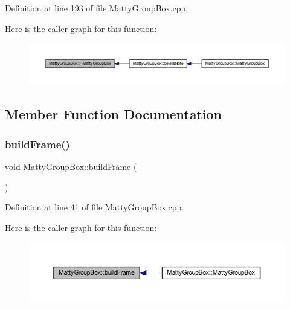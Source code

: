 Definition at line 193 of file Matty\+Group\+Box.\+cpp.

Here is the caller graph for this function\+:
\nopagebreak
\begin{figure}[H]
\begin{center}
\leavevmode
\includegraphics[width=350pt]{classMattyGroupBox_acf5f5023cf210a83e9846a35b149dd70_icgraph}
\end{center}
\end{figure}


\subsection{Member Function Documentation}
\hypertarget{classMattyGroupBox_ae9862aae672bd2cf4a99da541beef696}{}\label{classMattyGroupBox_ae9862aae672bd2cf4a99da541beef696} 
\subsubsection{\texorpdfstring{build\+Frame()}{buildFrame()}}
{\footnotesize\ttfamily void Matty\+Group\+Box\+::build\+Frame (\begin{DoxyParamCaption}{ }\end{DoxyParamCaption})\hspace{0.3cm}{\ttfamily [private]}}



Definition at line 41 of file Matty\+Group\+Box.\+cpp.

Here is the caller graph for this function\+:
\nopagebreak
\begin{figure}[H]
\begin{center}
\leavevmode
\includegraphics[width=350pt]{classMattyGroupBox_ae9862aae672bd2cf4a99da541beef696_icgraph}
\end{center}
\end{figure}
\hypertarget{classMattyGroupBox_ac7b7f1db6ea96e4c4b0f58fb87f86900}{}\label{classMattyGroupBox_ac7b7f1db6ea96e4c4b0f58fb87f86900} 
